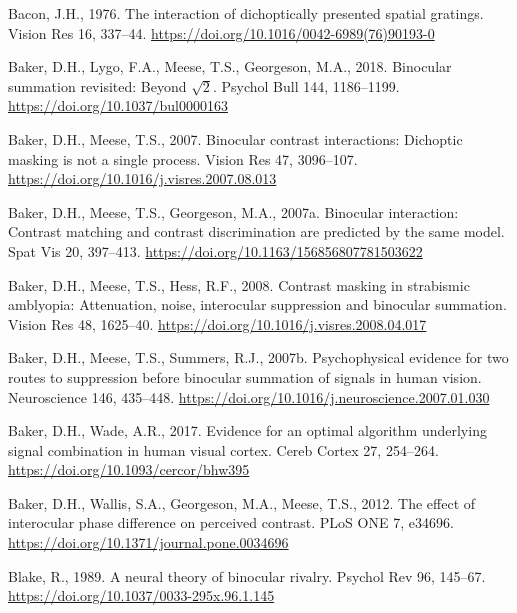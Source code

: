\documentclass[review,
  12pt,
]{elsarticle}
\newlength{\cslhangindent}
\newenvironment{CSLReferences}[2] %
 {\begin{list}{}{%
  \setlength{\itemindent}{0pt}
  \setlength{\leftmargin}{0pt}
  \setlength{\parsep}{0pt}
  \ifodd #1
   \setlength{\leftmargin}{\cslhangindent}
   \setlength{\itemindent}{-1\cslhangindent}
  \fi
  \setlength{\itemsep}{#2\baselineskip}}}
 {\end{list}}
\begin{document}
\label{refs}
\begin{CSLReferences}{1}{0}
Bacon, J.H., 1976. The interaction of dichoptically presented spatial
gratings. Vision Res 16, 337--44.
\url{https://doi.org/10.1016/0042-6989(76)90193-0}

Baker, D.H., Lygo, F.A., Meese, T.S., Georgeson, M.A., 2018. Binocular
summation revisited: Beyond \(\sqrt{2}\). Psychol Bull 144, 1186--1199.
\url{https://doi.org/10.1037/bul0000163}

Baker, D.H., Meese, T.S., 2007. Binocular contrast interactions:
Dichoptic masking is not a single process. Vision Res 47, 3096--107.
\url{https://doi.org/10.1016/j.visres.2007.08.013}

Baker, D.H., Meese, T.S., Georgeson, M.A., 2007a. Binocular interaction:
Contrast matching and contrast discrimination are predicted by the same
model. Spat Vis 20, 397--413.
\url{https://doi.org/10.1163/156856807781503622}

Baker, D.H., Meese, T.S., Hess, R.F., 2008. Contrast masking in
strabismic amblyopia: Attenuation, noise, interocular suppression and
binocular summation. Vision Res 48, 1625--40.
\url{https://doi.org/10.1016/j.visres.2008.04.017}

Baker, D.H., Meese, T.S., Summers, R.J., 2007b. Psychophysical evidence
for two routes to suppression before binocular summation of signals in
human vision. Neuroscience 146, 435--448.
\url{https://doi.org/10.1016/j.neuroscience.2007.01.030}

Baker, D.H., Wade, A.R., 2017. Evidence for an optimal algorithm
underlying signal combination in human visual cortex. Cereb Cortex 27,
254--264. \url{https://doi.org/10.1093/cercor/bhw395}

Baker, D.H., Wallis, S.A., Georgeson, M.A., Meese, T.S., 2012. The
effect of interocular phase difference on perceived contrast. PLoS ONE
7, e34696. \url{https://doi.org/10.1371/journal.pone.0034696}

Blake, R., 1989. A neural theory of binocular rivalry. Psychol Rev 96,
145--67. \url{https://doi.org/10.1037/0033-295x.96.1.145}


\end{CSLReferences}
\end{document}
